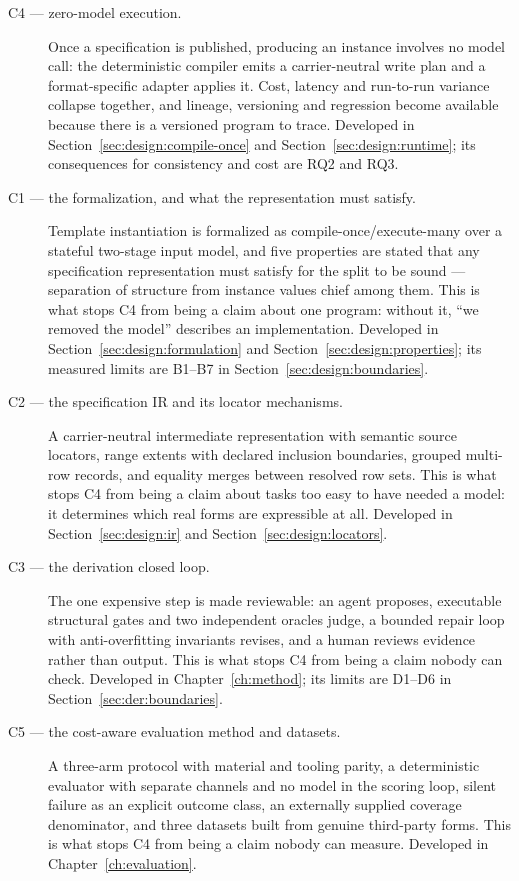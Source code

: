 \begin{description}
  \item[C4 --- zero-model execution.] Once a specification is published, producing an
    instance involves no model call: the deterministic compiler emits a carrier-neutral write
    plan and a format-specific adapter applies it. Cost, latency and run-to-run variance
    collapse together, and lineage, versioning and regression become available because there
    is a versioned program to trace. Developed in Section~\ref{sec:design:compile-once} and
    Section~\ref{sec:design:runtime}; its consequences for consistency and cost are RQ2 and
    RQ3.
  \item[C1 --- the formalization, and what the representation must satisfy.] Template
    instantiation is formalized as compile-once/execute-many over a stateful two-stage input
    model, and five properties are stated that any specification representation must satisfy
    for the split to be sound --- separation of structure from instance values chief among
    them. This is what stops C4 from being a claim about one program: without it, ``we removed
    the model'' describes an implementation. Developed in
    Section~\ref{sec:design:formulation} and Section~\ref{sec:design:properties}; its measured
    limits are B1--B7 in Section~\ref{sec:design:boundaries}.
  \item[C2 --- the specification IR and its locator mechanisms.] A carrier-neutral
    intermediate representation with semantic source locators, range extents with declared
    inclusion boundaries, grouped multi-row records, and equality merges between resolved row
    sets. This is what stops C4 from being a claim about tasks too easy to have needed a model:
    it determines which real forms are expressible at all. Developed in
    Section~\ref{sec:design:ir} and Section~\ref{sec:design:locators}.
  \item[C3 --- the derivation closed loop.] The one expensive step is made reviewable: an
    agent proposes, executable structural gates and two independent oracles judge, a bounded
    repair loop with anti-overfitting invariants revises, and a human reviews evidence rather
    than output. This is what stops C4 from being a claim nobody can check. Developed in
    Chapter~\ref{ch:method}; its limits are D1--D6 in Section~\ref{sec:der:boundaries}.
  \item[C5 --- the cost-aware evaluation method and datasets.] A three-arm protocol with
    material and tooling parity, a deterministic evaluator with separate channels and no model
    in the scoring loop, silent failure as an explicit outcome class, an externally supplied
    coverage denominator, and three datasets built from genuine third-party forms. This is
    what stops C4 from being a claim nobody can measure. Developed in
    Chapter~\ref{ch:evaluation}.
\end{description}

